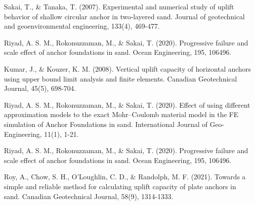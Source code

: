 \documentclass[a4paper, nobind]{templates/ociamthesis}
\newcommand*{\bibtitle}{Works Cited}
\begin{document}
Sakai, T., \& Tanaka, T. (2007). Experimental and numerical study of uplift behavior of shallow circular anchor in two-layered sand. Journal of geotechnical and geoenvironmental engineering, 133(4), 469-477.

Riyad, A. S. M., Rokonuzzaman, M., \& Sakai, T. (2020). Progressive failure and scale effect of anchor foundations in sand. Ocean Engineering, 195, 106496.

Kumar, J., \& Kouzer, K. M. (2008). Vertical uplift capacity of horizontal anchors using upper bound limit analysis and finite elements. Canadian Geotechnical Journal, 45(5), 698-704.

Riyad, A. S. M., Rokonuzzaman, M., \& Sakai, T. (2020). Effect of using different approximation models to the exact Mohr--Coulomb material model in the FE simulation of Anchor Foundations in sand. International Journal of Geo-Engineering, 11(1), 1-21.

Riyad, A. S. M., Rokonuzzaman, M., \& Sakai, T. (2020). Progressive failure and scale effect of anchor foundations in sand. Ocean Engineering, 195, 106496.

Roy, A., Chow, S. H., O'Loughlin, C. D., \& Randolph, M. F. (2021). Towards a simple and reliable method for calculating uplift capacity of plate anchors in sand. Canadian Geotechnical Journal, 58(9), 1314-1333.


\setlength{\baselineskip}{0pt} %

{\renewcommand*\MakeUppercase[1]{#1}%
\printbibliography[heading=bibintoc,title={\bibtitle}]}
\end{document}
